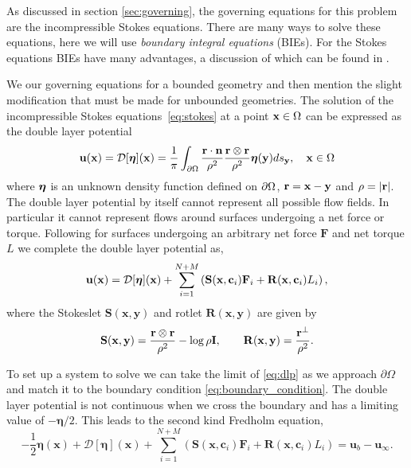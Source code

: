\documentclass[preprint, 10pt]{elsarticle}
\begin{document}
As discussed in section \ref{sec:governing}, the governing equations for this problem are the incompressible Stokes equations. There are many ways to solve these equations, here we will use \textit{boundary integral equations} (BIEs). For the Stokes equations BIEs have many advantages, a discussion of which can be found in \cite{Karrila1989}. 

We our governing equations for a bounded geometry and then mention the
slight modification that must be made for unbounded geometries.  The
solution of the incompressible Stokes equations~\eqref{eq:stokes} at a
point ${\mathbf{x}} \in \Omega$ can be expressed as the double layer
potential~\cite{Ladyzhenskaya1963, Pozrikidis1992}
\begin{align}
  \label{eq:dlp}
  {\mathbf{u}}({\mathbf{x}}) = {\mathcal{D}}[{\boldsymbol\eta}]({\mathbf{x}}) = \frac{1}{\pi}\int_{{\partial}\Omega}
  \frac{{\mathbf{r}}\cdot\mathbf{n}}{\rho^2}\frac{{\mathbf{r}} \otimes {\mathbf{r}}}{\rho^2}
  {\boldsymbol\eta}({\mathbf{y}}) ds_{{\mathbf{y}}}, \quad {\mathbf{x}} \in \Omega
\end{align}
where ${\boldsymbol\eta}$ is an unknown density function defined  on ${\partial}\Omega$,
${\mathbf{r}} = {\mathbf{x}} - {\mathbf{y}}$ and $\rho=|{\mathbf{r}}|$.  The double layer potential by
itself cannot represent all possible flow fields. In particular it
cannot represent flows around surfaces undergoing a net force or torque.
Following \cite{Power1987, Power1993} for surfaces undergoing an
arbitrary net force $\mathbf{F}$ and net torque $L$ we complete the
double layer potential as,
\begin{align*}
  {\mathbf{u}}({\mathbf{x}}) = {\mathcal{D}}[{\boldsymbol\eta}]({\mathbf{x}}) + \sum_{i=1}^{N+M} 
    \left(\mathbf{S}({\mathbf{x}},{\mathbf{c}}_i){\mathbf{F}}_i + \mathbf{R}({\mathbf{x}},{\mathbf{c}}_i)L_i\right),
\end{align*}
where the Stokeslet $\mathbf{S}(\mathbf{x},\mathbf{y})$ and rotlet $\mathbf{R}(\mathbf{x},\mathbf{y})$ are given by
\begin{align*}
  \mathbf{S}({\mathbf{x}},{\mathbf{y}}) = \frac{{\mathbf{r}} \otimes {\mathbf{r}}}{\rho^2} - 
  \log\rho\mathbf{I}, \qquad 
  \mathbf{R}({\mathbf{x}},{\mathbf{y}}) = \frac{{\mathbf{r}}^\perp}{\rho^2}.
\end{align*}

To set up a system to solve we can take the limit of \eqref{eq:dlp} as we approach $\partial\Omega$ and match it to the boundary condition \eqref{eq:boundary_condition}. The double layer potential is not continuous when we cross the boundary and has a limiting value of $-\pmb{\eta}/2$. This leads to the second kind Fredholm equation,
\begin{equation}\label{eq:vel_walls} -\frac{1}{2}\pmb{\eta}(\mathbf{x}) + \mathcal{D}[\pmb{\eta}](\mathbf{x}) + \sum\limits_{i=1}^{N+M} \left(\mathbf{S}(\mathbf{x},\mathbf{c}_i)\mathbf{F}_i + \mathbf{R}(\mathbf{x},\mathbf{c}_i)L_i\right) = \mathbf{u}_b - \mathbf{u}_\infty.\end{equation}
\end{document}
